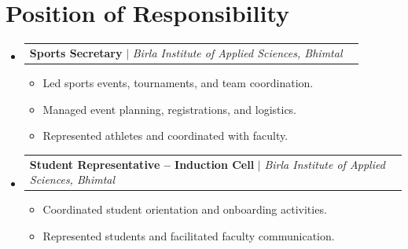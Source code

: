 \documentclass[letterpaper,11pt]{article}
\makeatletter
\newcommand{\resumeItem}[1]{
  \item\small{
    {#1 \vspace{-2pt}}
  }
}
\newcommand{\resumeProjectHeading}[2]{
    \item
    \begin{tabular*}{0.97\textwidth}{l@{\extracolsep{\fill}}r}
      \small#1 & #2 \\
    \end{tabular*}\vspace{-7pt}
}
\newcommand{\resumeSubHeadingListStart}{\begin{itemize}[leftmargin=0.15in, label={}]}
\newcommand{\resumeSubHeadingListEnd}{\end{itemize}}
\newcommand{\resumeItemListStart}{\begin{itemize}}
\newcommand{\resumeItemListEnd}{\end{itemize}\vspace{-5pt}}
\makeatother
\begin{document}
\section{Position of Responsibility}
  \resumeSubHeadingListStart
    \resumeProjectHeading
      {\textbf{Sports Secretary} $|$ \emph{Birla Institute of Applied Sciences, Bhimtal}}{}
      \resumeItemListStart
        \resumeItem{Led sports events, tournaments, and team coordination.}
        \resumeItem{Managed event planning, registrations, and logistics.}
        \resumeItem{Represented athletes and coordinated with faculty.}
      \resumeItemListEnd

    \resumeProjectHeading
      {\textbf{Student Representative -- Induction Cell} $|$ \emph{Birla Institute of Applied Sciences, Bhimtal}}{}
      \resumeItemListStart
        \resumeItem{Coordinated student orientation and onboarding activities.}
        \resumeItem{Represented students and facilitated faculty communication.}
      \resumeItemListEnd
  \resumeSubHeadingListEnd

\end{document}
